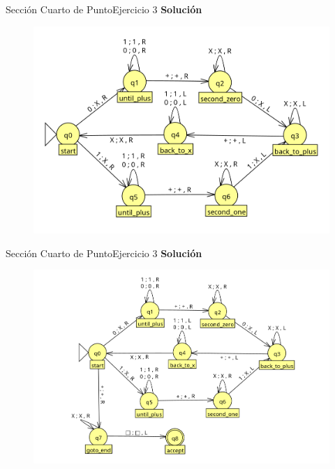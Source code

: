 \documentclass[10pt, envcountsect, presentation, aspectratio=169]{beamer}
\begin{document}

\begin{frame}{Sección Cuarto de Punto}{Ejercicio 3}
    \textbf{Solución}\\
    \begin{figure}
        \includegraphics[scale=0.25]{images/mct1ej3_3.png}
    \end{figure}
\end{frame}


\begin{frame}{Sección Cuarto de Punto}{Ejercicio 3}
    \textbf{Solución}\\
    \begin{figure}
        \includegraphics[scale=0.25]{images/mct1ej3_4.png}
    \end{figure}
\end{frame}
\end{document}
